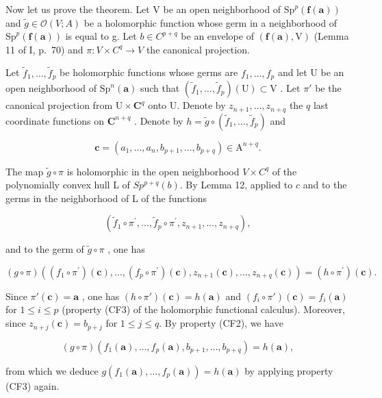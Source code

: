 Now let us prove the theorem. Let V be an open neighborhood of \(\mathrm{Sp}^{p}(\boldsymbol{f}(\boldsymbol{a}))\) and \(\widetilde{g}\in\mathcal{O}(V;A)\) be a holomorphic function whose germ in a neighborhood of \(\mathrm{Sp}^{p}(\boldsymbol{f}(\boldsymbol{a}))\) is equal to g. Let \(b\in C^{p+q}\) be an envelope of \((\boldsymbol{f}(\boldsymbol{a}),\mathrm{V})\) (Lemma 11 of I, p.~70) and \(\pi\colon V\times C^{q}\to V\) the canonical projection.

Let \(\widetilde{f}_1, \ldots, \widetilde{f}_p\) be holomorphic functions whose germs are \(f_1, \ldots, f_p\) and let U be an open neighborhood of \(\mathrm{Sp}^n(\boldsymbol{a})\) such that \((\widetilde{f}_1, \ldots, \widetilde{f}_p)(\mathrm{U}) \subset \mathrm{V}\) . Let \(\pi'\) be the canonical projection from \(\mathrm{U} \times \mathbf{C}^q\) onto U. Denote by \(z_{n+1}, \ldots, z_{n+q}\) the \(q\) last coordinate functions on \(\mathbf{C}^{n+q}\) . Denote by \(h = \widetilde{g} \circ (\widetilde{f}_1, \ldots, \widetilde{f}_p)\) and

\[
\boldsymbol {c} = (a _ {1}, \dots , a _ {n}, b _ {p + 1}, \dots , b _ {p + q}) \in \mathrm{A} ^ {n + q}.
\]

The map \(\widetilde{g} \circ \pi\) is holomorphic in the open neighborhood \(V \times C^q\) of the polynomially convex hull L of \(Sp^{p+q}(b)\). By Lemma 12, applied to \(c\) and to the germs in the neighborhood of L of the functions

\[
(\widetilde {f} _ {1} \circ \pi^ {\prime}, \ldots , \widetilde {f} _ {p} \circ \pi^ {\prime}, z _ {n + 1}, \ldots , z _ {n + q}),
\]

and to the germ of \(\widetilde{g}\circ\pi\) , one has

\[
(g \circ \pi) \left((f _ {1} \circ \pi^ {\prime}) (\boldsymbol {c}), \dots , (f _ {p} \circ \pi^ {\prime}) (\boldsymbol {c}), z _ {n + 1} (\boldsymbol {c}), \dots , z _ {n + q} (\boldsymbol {c})\right) = (h \circ \pi^ {\prime}) (\boldsymbol {c}).
\]

Since \(\pi'(\boldsymbol{c}) = \boldsymbol{a}\) , one has \((h \circ \pi')(\boldsymbol{c}) = h(\boldsymbol{a})\) and \((f_i \circ \pi')(\boldsymbol{c}) = f_i(\boldsymbol{a})\) for \(1 \leqslant i \leqslant p\) (property (CF3) of the holomorphic functional calculus). Moreover, since \(z_{n+j}(\boldsymbol{c}) = b_{p+j}\) for \(1 \leqslant j \leqslant q\). By property (CF2), we have

\[
(g \circ \pi) (f _ {1} (\boldsymbol {a}), \dots , f _ {p} (\boldsymbol {a}), b _ {p + 1}, \dots , b _ {p + q}) = h (\boldsymbol {a}),
\]

from which we deduce \(g(f_{1}(\boldsymbol{a}), \ldots, f_{p}(\boldsymbol{a})) = h(\boldsymbol{a})\) by applying property (CF3) again.

